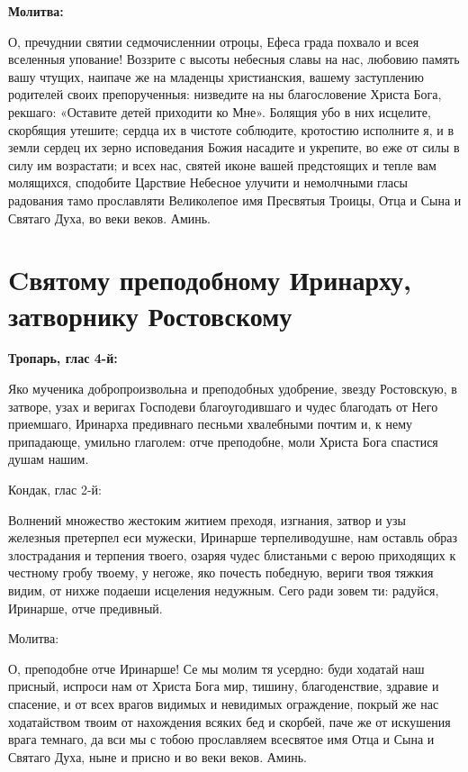 \bfseries Молитва:\normalfont{}\nopagebreak


О, пречуднии святии седмочисленнии отроцы, Ефеса града похвало и всея вселенныя упование! Воззрите с высоты небесныя славы на нас, любовию память вашу чтущих, наипаче же на младенцы христианския, вашему заступлению родителей своих препорученныя: низведите на ны благословение Христа Бога, рекшаго: «Оставите детей приходити ко Мне». Болящия убо в них исцелите, скорбящия утешите; сердца их в чистоте соблюдите, кротостию исполните я, и в земли сердец их зерно исповедания Божия насадите и укрепите, во еже от силы в силу им возрастати; и всех нас, святей иконе вашей предстоящих и тепле вам молящихся, сподобите Царствие Небесное улучити и немолчными гласы радования тамо прославляти Великолепое имя Пресвятыя Троицы, Отца и Сына и Святаго Духа, во веки веков. Аминь.


\section{Cвятому преподобному Иринарху, затворнику Ростовскому}
 


\bfseries Тропарь, глас 4-й:\normalfont{}\nopagebreak


Яко мученика добропроизвольна и преподобных удобрение, звезду Ростовскую, в затворе, узах и веригах Господеви благоугодившаго и чудес благодать от Него приемшаго, Иринарха предивнаго песньми хвалебными почтим и, к нему припадающе, умильно глаголем: отче преподобне, моли Христа Бога спастися душам нашим. 

\bfseries 

Кондак, глас 2-й:\normalfont{}


 Волнений множество жестоким житием преходя, изгнания, затвор и узы железныя претерпел еси мужески, Иринарше терпеливодушне, нам оставль образ злострадания и терпения твоего, озаряя чудес блистаньми с верою приходящих к честному гробу твоему, у негоже, яко почесть победную, вериги твоя тяжкия видим, от нихже подаеши исцеления недужным. Сего ради зовем ти: радуйся, Иринарше, отче предивный. 

\bfseries 

Молитва:\normalfont{}


О, преподобне отче Иринарше! Се мы молим тя усердно: буди ходатай наш присный, испроси нам от Христа Бога мир, тишину, благоденствие, здравие и спасение, и от всех врагов видимых и невидимых ограждение, покрый же нас ходатайством твоим от нахождения всяких бед и скорбей, паче же от искушения врага темнаго, да вси мы с тобою прославляем всесвятое имя Отца и Сына и Святаго Духа, ныне и присно и во веки веков. Аминь. 


